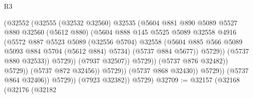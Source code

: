\begin{lexlean}{R3}
\begin{coremodule}
                                        (@32552
                                          (@32555
                                            (@32532 @32560)
                                            @32535
                                            (@5604
                                              @881
                                              @890
                                              @5089
                                              @5527
                                              @880
                                              @32560
                                              (@5612 @880)
                                              (@5604
                                                @888
                                                @145
                                                @5525
                                                @5089
                                                @32558
                                                @4916
                                                (@5572
                                                  @887
                                                  @5523
                                                  @5089
                                                  (@32556 @5704)
                                                  @32558
                                                  (@5604
                                                    @885
                                                    @566
                                                    @5089
                                                    @5093
                                                    @884
                                                    @5704
                                                    (@5612 @884)
                                                    @5734)
                                                  (@5737 @884 @5677))
                                                @5729))
                                            (@5737 @880 @32533))
                                          @5729))
                                      (@7937 @32507))
                                    @5729))
                                (@5737 @876 @32482))
                              @5729))
                          (@5737 @872 @32456))
                        @5729))
                    (@5737 @868 @32430))
                  @5729))
              (@5737 @864 @32406))
            @5729))
        (@7923 @32382))
      @5729)
@32709 := @32157
    (@32168
      (@32176
        (@32182

\end{coremodule}
\end{lexlean}
